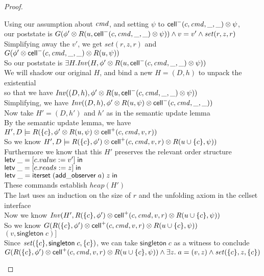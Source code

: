 \begin{proof}
\begin{tabbedproof}
\ooo Using our assumption about $\mathit{cmd}$, and setting $\psi$ to $\mathsf{cell}^{-}({c}, {\mathit{cmd}}, {\_}, {\_}) \otimes \psi$, \\
\ooo our poststate is $G(\phi' \otimes R(u, \mathsf{cell}^{-}({c}, {\mathit{cmd}}, {\_}, {\_}) \otimes \psi)) \land v = v' \land \mathit{set}(r, z, r)$ \\
\ooo Simplifying away the $v'$, we get $\mathit{set}(r, z, r)$ and $G(\phi' \otimes \mathsf{cell}^{-}({c}, {\mathit{cmd}}, {\_}, {\_}) \otimes R(u, \psi))$ \\
\ooo So our poststate is $\exists H. \mathit{Inv}(H, \phi' \otimes R(u, \mathsf{cell}^{-}({c}, {\mathit{cmd}}, {\_}, {\_}) \otimes \psi))$ \\ 
\ooo We will shadow our original $H$, and bind a new $H = (D,h)$ to unpack the existential \\
\ooo so that we have $\mathit{Inv}((D, h), \phi' \otimes R(u, \mathsf{cell}^{-}({c}, {\mathit{cmd}}, {\_}, {\_}) \otimes \psi))$ \\
\ooo Simplifying, we have $\mathit{Inv}((D, h), \phi' \otimes R(u, \psi) \otimes \mathsf{cell}^{-}({c}, {\mathit{cmd}}, {\_}, {\_}))$ \\
\ooo Now take $H' = (D,h')$ and $h'$ as in the semantic update lemma \\
\ooo By the semantic update lemma, we have $H', D \models R(\{{c}\}, \phi' \otimes R(u, \psi) \otimes \mathsf{cell}^{+}({c}, {\mathit{cmd}}, {v}, {r}))$\\
\ooo So we know $H', D \models R(\{{c}\}, \phi') \otimes \mathsf{cell}^{+}({c}, {\mathit{cmd}}, {v}, {r}) \otimes R(u \cup \{{c}\}, \psi))$ \\
\ooo Furthermore we know that this $H'$ preserves the relevant order structure \\
\ooo $\mathsf{letv}\;\_ = [c.value := v']\;\mathsf{in}\;$ \\
\ooo $\mathsf{letv}\;\_ = [c.reads := z]\;\mathsf{in}\;$ \\
\ooo $\mathsf{letv}\;\_ = \mathsf{iterset}\;(\mathsf{add\_observer}\;a)\;z\;\mathsf{in}\;$ \\
\ooo These commands establish $\mathit{heap}(H')$ \\
\ooo The last uses an induction on the size of $r$ and the unfolding axiom in the cellset interface \\
\ooo Now we know $\mathit{Inv}(H', R(\{{c}\}, \phi') \otimes \mathsf{cell}^{+}({c}, {\mathit{cmd}}, {v}, {r}) \otimes R(u \cup \{{c}\}, \psi))$ \\
\ooo So we know $G(R(\{{c}\}, \phi') \otimes \mathsf{cell}^{+}({c}, {\mathit{cmd}}, {v}, {r}) \otimes R(u \cup \{{c}\}, \psi))$ \\
\ooo $(v, \mathsf{singleton}\;c)]$ \\
\ooo Since $\mathit{set}(\{{c}\}, \mathsf{singleton}\;c, \{{c}\})$, we can
     take $\mathsf{singleton}\;c$ as a witness to conclude \\
\ooo $G(R(\{{c}\}, \phi') \otimes \mathsf{cell}^{+}({c}, {\mathit{cmd}}, {v}, {r}) \otimes R(u \cup \{{c}\}, \psi)) \land \exists z.\;a = (v,z) \land \mathit{set}(\{{c}\}, z, \{{c}\})$ 
\end{tabbedproof}
\end{proof}

